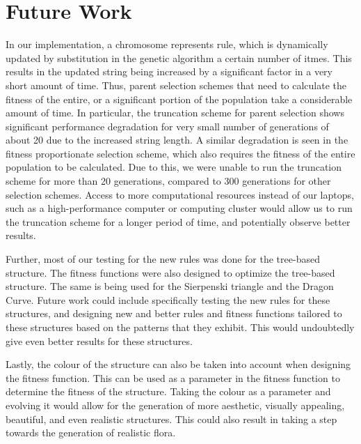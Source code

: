 \section{Future Work}
In our implementation, a chromosome represents rule, which is dynamically updated by substitution in the genetic algorithm a certain number of itmes. This results in the updated string being increased by a significant factor in a very short amount of time. Thus, parent selection schemes that need to calculate the fitness of the entire, or a significant portion of the population take a considerable amount of time. In particular, the truncation scheme for parent selection shows significant performance degradation for very small number of generations of about 20 due to the increased string length. A similar degradation is seen in the fitness proportionate selection scheme, which also requires the fitness of the entire population to be calculated. Due to this, we were unable to run the truncation scheme for more than 20 generations, compared to 300 generations for other selection schemes. Access to more computational resources instead of our laptops, such as a high-performance computer or computing cluster would allow us to run the truncation scheme for a longer period of time, and potentially observe better results. 

Further, most of our testing for the new rules was done for the tree-based structure. The fitness functions were also designed to optimize the tree-based structure. The same is being used for the Sierpenski triangle and the Dragon Curve. Future work could include specifically testing the new rules for these structures, and designing new and better rules and fitness functions tailored to these structures based on the patterns that they exhibit. This would undoubtedly give even better results for these structures.

Lastly, the colour of the structure can also be taken into account when designing the fitness function. This can be used as a parameter in the fitness function to determine the fitness of the structure. Taking the colour as a parameter and evolving it would allow for the generation of more aesthetic, visually appealing, beautiful, and even realistic structures. This could also result in taking a step towards the generation of realistic flora.